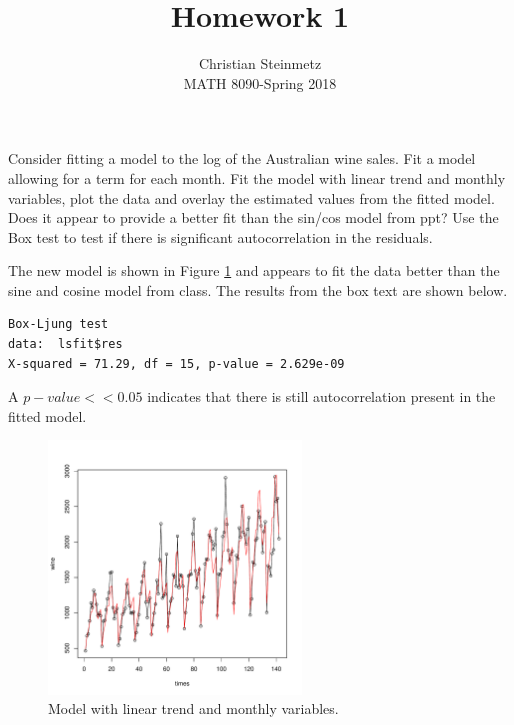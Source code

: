 \documentclass[12pt]{article}
\newenvironment{solution}[2][Solution]{\begin{trivlist}
\item[\hskip \labelsep {\bfseries #1}]}{\end{trivlist}}
\newenvironment{problem}[2][Problem]{\begin{trivlist}
\item[\hskip \labelsep {\bfseries #1}\hskip \labelsep {\bfseries #2.}]}{\end{trivlist}}
\begin{document}
 
 
\title{Homework 1}%
\author{Christian Steinmetz\\ %
MATH 8090-Spring 2018} %
 
\maketitle
\begin{problem}{7}
Consider fitting a model to the log of the Australian wine sales. Fit a model allowing for a term for each month. Fit the model with linear trend and monthly variables, plot the data and overlay the estimated values from the fitted model. Does it appear to provide a better fit than the sin/cos model from ppt? Use the Box test to test if there is significant autocorrelation in the residuals.
\end{problem}

\begin{solution}{}
The new model is shown in Figure \ref{fig:monthly_model} and appears to fit the data better than the sine and cosine model from class. The results from the box text are shown below. 

\begin{lstlisting}
Box-Ljung test
data:  lsfit$res
X-squared = 71.29, df = 15, p-value = 2.629e-09
\end{lstlisting}

\noindent
A $p-value << 0.05$ indicates that there is still autocorrelation present in the fitted model.
\vspace*{-1cm}
\begin{figure}[H]
    \centering
    \includegraphics[width=0.6\textwidth]{figs/problem_7/monthly_model.pdf}
    \caption{Model with linear trend and monthly variables.}
    \label{fig:monthly_model}
\end{figure}

\end{solution}
\pagebreak
\end{document}
